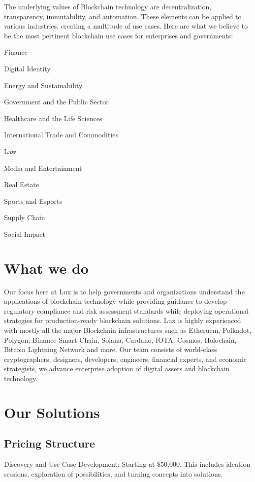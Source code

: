 \documentclass[11pt]{article}
\begin{document}
The underlying values of Blockchain technology are decentralization, transparency, immutability, and automation. These elements can be applied to various industries, creating a multitude of use cases. Here are what we believe to be the most pertinent blockchain use cases for enterprises and governments:


Finance


Digital Identity


Energy and Sustainability


Government and the Public Sector


Healthcare and the Life Sciences


International Trade and Commodities


Law


Media and Entertainment


Real Estate


Sports and Esports


Supply Chain


Social Impact


\section{What we do}

Our focus here at Lux is to help governments and organizations understand the applications of blockchain technology while providing guidance to develop regulatory compliance and risk assessment standards  while deploying operational strategies for production-ready blockchain solutions. Lux is highly experienced with mostly all the major Blockchain infrastructures such as Etheruem, Polkadot, Polygon, Binance Smart Chain, Solana, Cardano, IOTA, Cosmos, Holochain, Bitcoin Lightning Network and more. Our team consists of world-class cryptographers, designers, developers, engineers, financial experts, and economic strategists, we advance enterprise adoption of digital assets and blockchain technology.


\section{Our Solutions}

\subsection{Pricing Structure}

Discovery and Use Case Development: Starting at \$50,000. This includes ideation sessions, exploration of possibilities, and turning concepts into solutions.
\end{document}
